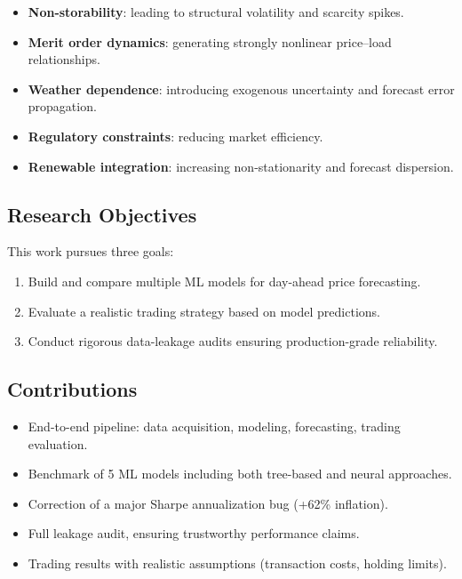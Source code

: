 \documentclass[11pt,a4paper]{article}
\begin{document}
\begin{itemize}
    \item \textbf{Non-storability}: leading to structural volatility and scarcity spikes.
    \item \textbf{Merit order dynamics}: generating strongly nonlinear price–load relationships.
    \item \textbf{Weather dependence}: introducing exogenous uncertainty and forecast error propagation.
    \item \textbf{Regulatory constraints}: reducing market efficiency.
    \item \textbf{Renewable integration}: increasing non-stationarity and forecast dispersion.
\end{itemize}

\subsection{Research Objectives}

This work pursues three goals:

\begin{enumerate}
    \item Build and compare multiple ML models for day-ahead price forecasting.
    \item Evaluate a realistic trading strategy based on model predictions.
    \item Conduct rigorous data-leakage audits ensuring production-grade reliability.
\end{enumerate}

\subsection{Contributions}

\begin{itemize}
    \item End-to-end pipeline: data acquisition, modeling, forecasting, trading evaluation.
    \item Benchmark of 5 ML models including both tree-based and neural approaches.
    \item Correction of a major Sharpe annualization bug (+62\% inflation).
    \item Full leakage audit, ensuring trustworthy performance claims.
    \item Trading results with realistic assumptions (transaction costs, holding limits).
\end{itemize}
\end{document}
